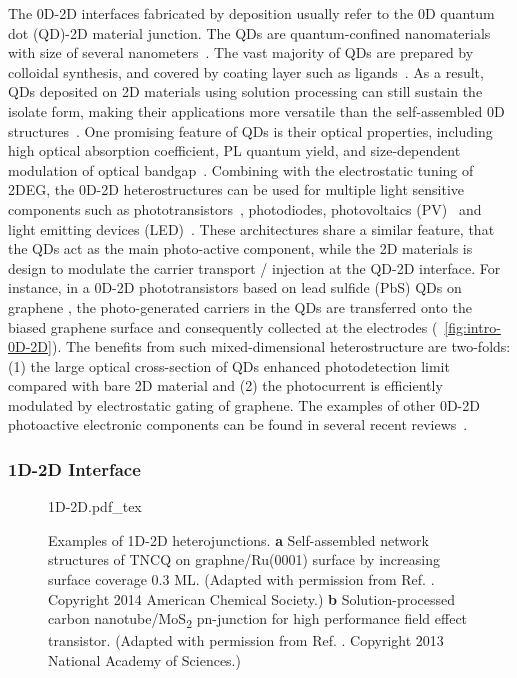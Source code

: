 The 0D-2D interfaces fabricated by deposition usually refer to the 0D
quantum dot (QD)-2D material junction. The QDs are
quantum-confined nano\-materials with size of several
nano\-meters~\autocite{Sargent_2013_colloidal_book}.
%
The vast majority of QDs are prepared by colloidal synthesis, and
covered by coating layer such as ligands~\autocite{Kim_2013_QD_rev}.
%
As a result, QDs deposited on 2D materials using solution processing
can still sustain the isolate form, making their applications more
versatile than the self-assembled 0D
structures~\autocite{Jariwala_2016_mixed_vdw_het}.
%
One promising feature of QDs is their optical properties, including
high optical absorption coefficient, PL quantum yield, and
size-dependent modulation of optical
bandgap~\autocite{Xia_2014_2D_nanophoto_rev}.
%
Combining with the electrostatic tuning of 2DEG, the 0D-2D
heterostructures can be used for multiple light sensitive components
such as
photo\-transistors~\autocite{Kufer_2014_QD-mos2,Konstantatos_2012_QD_gr_trans},
photo\-diodes\autocite{Kufer_2014_QD-mos2}, photo\-voltaics
(PV)~\autocite{Guo_2010_gr_QD_PV,Wang_2016_QD_PV} and light emitting
devices (LED)~\autocite{Son_2012_ZnO-Gr-QD}.
%
These architectures share a similar feature, that the QDs act as the
main photo-active component, while the 2D materials is design to
modulate the carrier transport / injection at the QD-2D interface.
%
For instance, in a 0D-2D photo\-transistors based on lead sulfide
(PbS) QDs on graphene \autocite{Konstantatos_2012_QD_gr_trans}, the
photo-generated carriers in the QDs are transferred onto the biased
graphene surface and consequently collected at the electrodes
(~\autoref{fig:intro-0D-2D}). The benefits from such
mixed-dimensional heterostructure are two-folds: (1) the large optical
cross-section of QDs enhanced photo\-detection limit compared with
bare 2D material and (2) the photo\-current is efficiently modulated
by electrostatic gating of graphene.
%
The examples of other 0D-2D photo\-active electronic components can be
found in several recent
reviews~\autocite{Jariwala_2016_mixed_vdw_het,Kufer_2016_QD_FET_rev}.


\subsubsection{1D-2D Interface}
\label{sec:orgeadf57e}

\begin{figure}[h]
  \centering
  {1D-2D.pdf_tex}
  \caption{\label{fig:intro-1D-2D}%
    Examples of 1D-2D hetero\-junctions. \textbf{a} Self-assembled
    network structures of TNCQ on graphne/Ru(0001) surface by
    increasing surface coverage 0.3 ML. (Adapted with permission from
    Ref. \cite{Maccariello_2014_TCNQ_gr_Ru}. Copyright 2014 American
    Chemical Society.) \textbf{b} Solution-processed  carbon
    nano\-tube/MoS\textsubscript{2} pn-junction for high performance
    field effect transistor. (Adapted with permission from
    Ref. \cite{Jariwala_2013_CNT-mos2}. Copyright 2013 National
    Academy of Sciences.)}
\end{figure}

